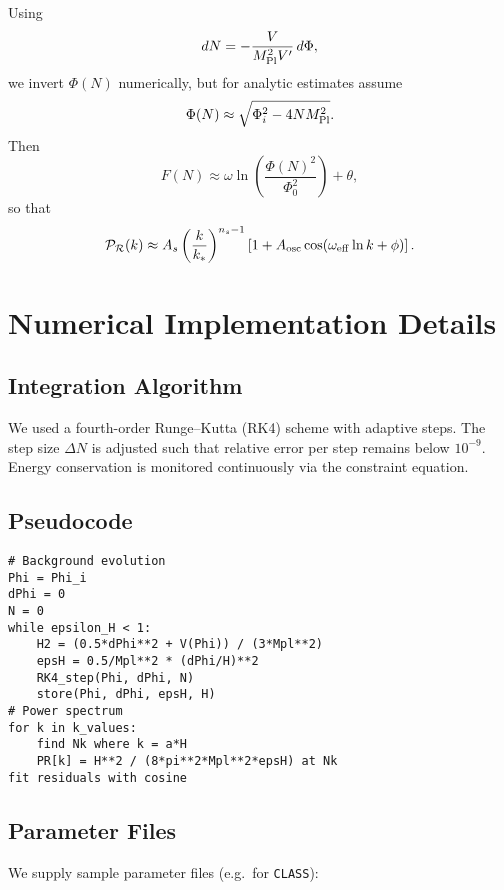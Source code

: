 \documentclass[reprint, amsmath, amssymb, aps, prd, nofootinbib]{revtex4-2}
\begin{document}
Using
\begin{equation}
dN = -\frac{V}{M_{\rm Pl}^2 V'}\,d\Phi,
\end{equation}
we invert $\Phi(N)$ numerically, but for analytic estimates assume
\begin{equation}
\Phi(N)\approx \sqrt{\Phi_i^2 - 4 N M_{\rm Pl}^2}.
\end{equation}
Then
\begin{equation}
F(N) \approx \omega \ln\!\left(\frac{\Phi(N)^2}{\Phi_0^2}\right)+\theta,
\end{equation}
so that
\begin{equation}
\mathcal{P}_\mathcal{R}(k) \approx
A_s\left(\frac{k}{k_*}\right)^{n_s-1}
\left[ 1 + A_{\rm osc}\cos(\omega_{\rm eff}\ln k+\phi)\right].
\end{equation}

\section{Numerical Implementation Details}

\subsection{Integration Algorithm}

We used a fourth-order Runge--Kutta (RK4) scheme with adaptive steps.
The step size $\Delta N$ is adjusted such that relative error per step
remains below $10^{-9}$. Energy conservation is monitored continuously
via the constraint equation.

\subsection{Pseudocode}

\begin{verbatim}
# Background evolution
Phi = Phi_i
dPhi = 0
N = 0
while epsilon_H < 1:
    H2 = (0.5*dPhi**2 + V(Phi)) / (3*Mpl**2)
    epsH = 0.5/Mpl**2 * (dPhi/H)**2
    RK4_step(Phi, dPhi, N)
    store(Phi, dPhi, epsH, H)
# Power spectrum
for k in k_values:
    find Nk where k = a*H
    PR[k] = H**2 / (8*pi**2*Mpl**2*epsH) at Nk
fit residuals with cosine
\end{verbatim}

\subsection{Parameter Files}

We supply sample parameter files (e.g.\ for \texttt{CLASS}):
\end{document}
